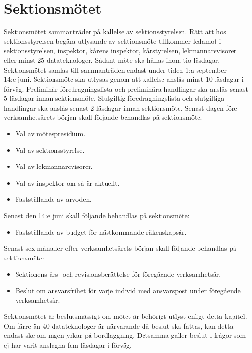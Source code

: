 \documentclass[a4paper]{dteklag}
\begin{document}
\section{Sektionsmötet}
\para[Sammanträden] Sektionsmötet sammanträder på kallelse av sektionsstyrelsen.
\para Rätt att hos sektionsstyrelsen begära utlysande av sektionsmöte tillkommer ledamot i sektionsstyrelsen, inspektor, kårens inspektor, kårstyrelsen, lekmannarevisorer eller minst 25 datateknologer. Sådant möte ska hållas inom tio läsdagar.
\para Sektionsmötet samlas till sammanträden endast under tiden 1:a september — 14:e juni.
\para[Kallelse] Sektionsmöte ska utlysas genom att kallelse anslås minst 10 läsdagar i förväg.
\para Preliminär föredragningslista och preliminära handlingar ska anslås senast 5 läsdagar innan sektionsmöte.
\para Slutgiltig föredragningslista och slutgiltiga handlingar ska anslås senast 2 läsdagar innan sektionsmöte.
\para[Årsmöte] Senast dagen före verksamhetsårets början skall följande behandlas på sektionsmöte.
\begin{itemize}
\item Val av mötespresidium.
\item Val av sektionsstyrelse.
\item Val av lekmannarevisorer.
\item Val av inspektor om så är aktuellt.
\item Fastställande av arvoden.
\end{itemize}
\para[Vårmöte] Senast den 14:e juni skall följande behandlas på sektionsmöte:
\begin{itemize}
\item Fastställande av budget för nästkommande räkenskapsår.
\end{itemize}
\para [Dechargemöte] Senast sex månader efter verksamhetsårets början skall följande behandlas på sektionsmöte:
\begin{itemize}
\item Sektionens års- och revisionsberättelse för föregående verksamhetsår.
\item Beslut om ansvarsfrihet för varje individ med ansvarspost under föregående verksamhetsår.
\end{itemize}
\para[Beslutförhet] Sektionsmötet är beslutsmässigt om mötet är behörigt utlyst enligt detta kapitel.
\stycke
Om färre än 40 datateknologer är närvarande då beslut ska fattas, kan detta endast ske om ingen yrkar på bordläggning.
\stycke Detsamma gäller beslut i frågor som ej har varit anslagna fem läsdagar i förväg.
\end{document}
